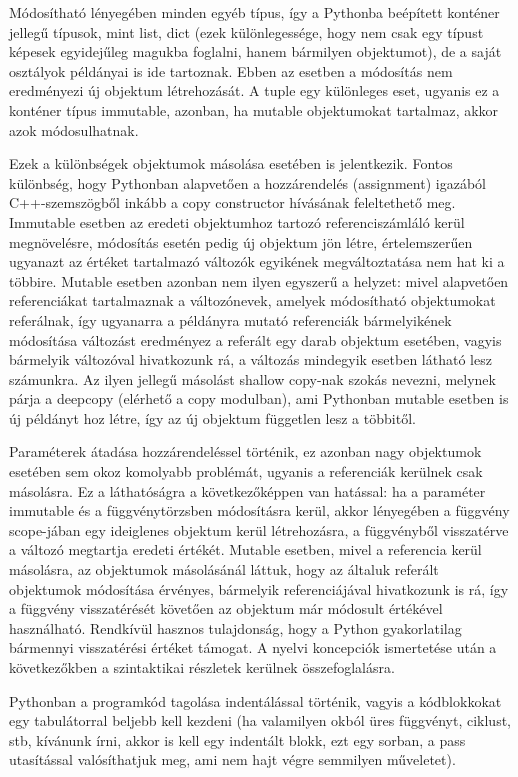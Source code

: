 \documentclass[12pt,a4paper,oneside]{report}             %
\begin{document}
Módosítható lényegében minden egyéb típus, így a Pythonba beépített konténer jellegű típusok, mint list, dict (ezek különlegessége, hogy nem csak egy típust képesek egyidejűleg magukba foglalni, hanem bármilyen objektumot), de a saját osztályok példányai is ide tartoznak. Ebben az esetben a módosítás nem eredményezi új objektum létrehozását. A tuple egy különleges eset, ugyanis ez a konténer típus immutable, azonban, ha mutable objektumokat tartalmaz, akkor azok módosulhatnak.

Ezek a különbségek objektumok másolása esetében is jelentkezik. Fontos különbség, hogy Pythonban alapvetően a hozzárendelés (assignment) igazából C++-szemszögből inkább a copy constructor hívásának feleltethető meg. Immutable esetben az eredeti objektumhoz tartozó referenciszámláló kerül megnövelésre, módosítás esetén pedig új objektum jön létre, értelemszerűen ugyanazt az értéket tartalmazó változók egyikének megváltoztatása nem hat ki a többire. Mutable esetben azonban nem ilyen egyszerű a helyzet: mivel alapvetően referenciákat tartalmaznak a változónevek, amelyek módosítható objektumokat referálnak, így ugyanarra a példányra mutató referenciák bármelyikének módosítása változást eredményez a referált egy darab objektum esetében, vagyis bármelyik változóval hivatkozunk rá, a változás mindegyik esetben látható lesz számunkra. Az ilyen jellegű másolást shallow copy-nak szokás nevezni, melynek párja a deepcopy (elérhető a copy modulban), ami Pythonban mutable esetben is új példányt hoz létre, így az új objektum független lesz a többitől.

Paraméterek átadása hozzárendeléssel történik, ez azonban nagy objektumok esetében sem okoz komolyabb problémát, ugyanis a referenciák kerülnek csak másolásra. Ez a láthatóságra a következőképpen van hatással: ha a paraméter immutable és a függvénytörzsben módosításra kerül, akkor lényegében a függvény scope-jában egy ideiglenes objektum kerül létrehozásra, a függvényből visszatérve a változó megtartja eredeti értékét. Mutable esetben, mivel a referencia kerül másolásra, az objektumok másolásánál láttuk, hogy az általuk referált objektumok módosítása érvényes, bármelyik referenciájával hivatkozunk is rá, így a függvény visszatérését követően az objektum már módosult értékével használható.
Rendkívül hasznos tulajdonság, hogy a Python gyakorlatilag bármennyi visszatérési értéket támogat.
A nyelvi koncepciók ismertetése után a következőkben a szintaktikai részletek kerülnek összefoglalásra.

Pythonban a programkód tagolása indentálással történik, vagyis a kódblokkokat egy tabulátorral beljebb kell kezdeni (ha valamilyen okból üres függvényt, ciklust, stb, kívánunk írni, akkor is kell egy indentált blokk, ezt egy sorban, a pass utasítással valósíthatjuk meg, ami nem hajt végre semmilyen műveletet).
\end{document}
